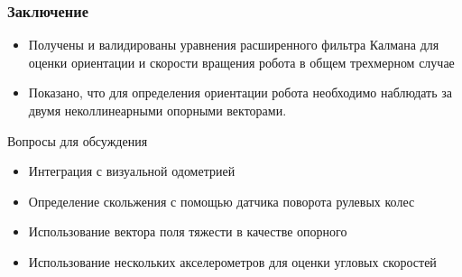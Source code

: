 \documentclass[utf8]{beamer}
\begin{document}
\begin{frame}
\frametitle{Заключение}
\begin{itemize}
    \item Получены и валидированы уравнения расширенного фильтра Калмана для
        оценки ориентации и скорости вращения робота в общем трехмерном случае
    \item Показано, что для определения ориентации робота необходимо
        наблюдать за двумя неколлинеарными опорными векторами.
\end{itemize}
\begin{block}{Вопросы для обсуждения}
    \begin{itemize}
        \item Интеграция с визуальной одометрией
        \item Определение скольжения с помощью датчика поворота рулевых колес
        \item Использование вектора поля тяжести в качестве опорного
        \item Использование нескольких акселерометров для оценки угловых
            скоростей
    \end{itemize}
\end{block}
\end{frame}
\end{document}

